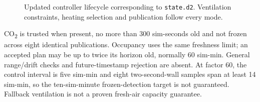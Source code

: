 \documentclass[11pt,a4paper]{article}
\begin{document}
\begin{figure}[htbp]
\begin{lrbox}{\reportdiagram}
\end{lrbox}
\resizebox{\linewidth}{!}{\usebox{\reportdiagram}}
\caption{Updated controller lifecycle corresponding to \texttt{state.d2}. Ventilation constraints, heating selection and publication follow every mode.}\label{fig:state}
\end{figure}
CO\textsubscript{2} is trusted when present, no more than 300 sim-seconds old and not frozen across eight identical publications. Occupancy uses the same freshness limit; an accepted plan may be up to twice its horizon old, normally 60 sim-min. General range/drift checks and future-timestamp rejection are absent. At factor 60, the control interval is five sim-min and eight two-second-wall samples span at least 14 sim-min, so the ten-sim-minute frozen-detection target is not guaranteed. Fallback ventilation is not a proven fresh-air capacity guarantee.
\end{document}
